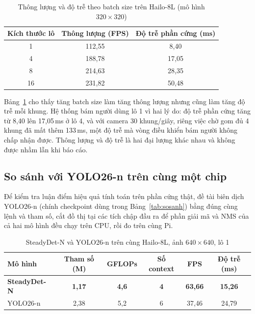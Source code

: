 \begin{table}[H]
\centering
\caption{Thông lượng và độ trễ theo batch size trên Hailo-8L (mô hình $320\times320$)}
\label{tab:batch}
\small
\renewcommand{\arraystretch}{1.15}
\begin{tabular}{@{}ccc@{}}
\toprule
\textbf{Kích thước lô} & \textbf{Thông lượng (FPS)} & \textbf{Độ trễ phần cứng (ms)}\\
\midrule
1 & 112,55 & 8,40\\
4 & 188,78 & 17,05\\
8 & 214,63 & 28,35\\
16 & 231,82 & 50,48\\
\bottomrule
\end{tabular}
\end{table}

Bảng~\ref{tab:batch} cho thấy tăng batch size làm tăng thông lượng nhưng cũng làm tăng độ trễ mỗi khung. Hệ thống bám người dùng lô 1 vì hai lý do: độ trễ phần cứng tăng từ 8,40 lên 17,05\,ms ở lô 4, và với camera 30 khung/giây, riêng việc chờ gom đủ 4 khung đã mất thêm 133\,ms, một độ trễ mà vòng điều khiển bám người không chấp nhận được. Thông lượng và độ trễ là hai đại lượng khác nhau và không được nhầm lẫn khi báo cáo.

\subsection{So sánh với YOLO26-n trên cùng một chip}

Để kiểm tra luận điểm hiệu quả tính toán trên phần cứng thật, đề tài biên dịch YOLO26-n (chính checkpoint dùng trong Bảng~\ref{tab:sosanh}) bằng đúng cùng lệnh và tham số, cắt đồ thị tại các tích chập đầu ra để phần giải mã và NMS của cả hai mô hình đều chạy trên CPU, rồi đo trên cùng Pi.

\begin{table}[H]
\centering
\caption{SteadyDet-N và YOLO26-n trên cùng Hailo-8L, ảnh $640\times640$, lô 1}
\label{tab:yolo26hailo}
\small
\renewcommand{\arraystretch}{1.15}
\begin{tabular}{@{}lccccc@{}}
\toprule
\textbf{Mô hình} & \textbf{Tham số (M)} & \textbf{GFLOPs} & \textbf{Số context} & \textbf{FPS} & \textbf{Độ trễ (ms)}\\
\midrule
\textbf{SteadyDet-N} & \textbf{1,17} & \textbf{4,6} & \textbf{4} & \textbf{63,66} & \textbf{15,26}\\
YOLO26-n & 2,38 & 5,2 & 6 & 37,46 & 24,79\\
\bottomrule
\end{tabular}
\end{table}

